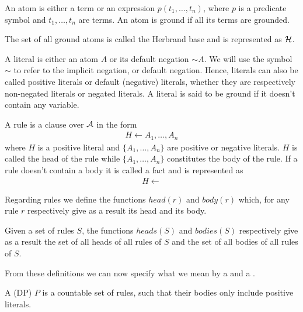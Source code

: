 \begin{definition}[Atom]
An atom is either a term or an expression $p(t_{1},\ldots,t_{n})$, where $p$ is a predicate symbol and $t_{1},\ldots,t_{n}$ are terms. An atom is ground if all its terms are grounded.
\end{definition}

\begin{definition}
The set of all ground atoms is called the Herbrand base and is represented as $\cal{H}$.
\end{definition}

\begin{definition}[Literal]
A literal is either an atom $A$ or its default negation $\sim A$. 
We will use the symbol $\sim$ to refer to the implicit negation, or default negation. Hence, literals can also be called positive literals or default (negative) literals, whether they are respectively non-negated literals or negated literals.
A literal is said to be ground if it doesn't contain any variable.
\end{definition}

\begin{definition}[Rule]
A rule is a clause over $\cal{A}$ in the form
\begin{align*}
H\leftarrow A_{1},\ldots,A_{n}
\end{align*}
where $H$ is a positive literal and $\{A_{1},\ldots,A_{n}\}$ are positive or negative literals. $H$ is called the head of the rule while $\{A_{1},\ldots,A_{n}\}$ constitutes the body of the rule. If a rule doesn't contain a body it is called a fact and is represented as 
\begin{align*}
H\leftarrow 
\end{align*}
\end{definition}

\begin{definition}
Regarding rules we define the functions $head(r)$ and $body(r)$ which, for any rule $r$ respectively give as a result its head and its body.

Given a set of rules $S$, the functions $heads(S)$ and $bodies(S)$ respectively give as a result the set of all heads of all rules of $S$ and the set of all bodies of all rules of $S$.
\end{definition}


From these definitions we can now specify what we mean by a \DefP and a \NLP.

\begin{definition}[\DefP]
A  (DP) $P$ is a countable set of rules, such that their bodies only include positive literals.
\end{definition}

